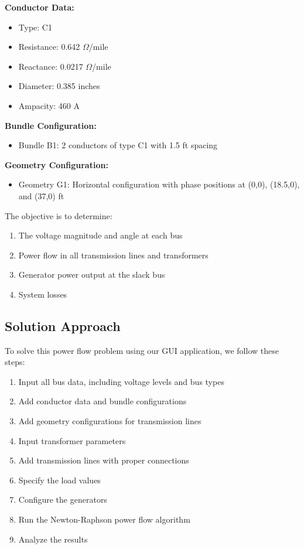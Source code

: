 \documentclass{article}
\begin{document}
	\noindent \textbf{Conductor Data:}
	\begin{itemize}
		\item Type: C1
		\item Resistance: 0.642 $\Omega$/mile
		\item Reactance: 0.0217 $\Omega$/mile
		\item Diameter: 0.385 inches
		\item Ampacity: 460 A
	\end{itemize}
	
	\noindent \textbf{Bundle Configuration:}
	\begin{itemize}
		\item Bundle B1: 2 conductors of type C1 with 1.5 ft spacing
	\end{itemize}
	
	\noindent \textbf{Geometry Configuration:}
	\begin{itemize}
		\item Geometry G1: Horizontal configuration with phase positions at (0,0), (18.5,0), and (37,0) ft
	\end{itemize}
	
	The objective is to determine:
	\begin{enumerate}
		\item The voltage magnitude and angle at each bus
		\item Power flow in all transmission lines and transformers
		\item Generator power output at the slack bus
		\item System losses
	\end{enumerate}
	
	\subsection{Solution Approach}
	
	To solve this power flow problem using our GUI application, we follow these steps:
	
	\begin{enumerate}
		\item Input all bus data, including voltage levels and bus types
		\item Add conductor data and bundle configurations
		\item Add geometry configurations for transmission lines
		\item Input transformer parameters
		\item Add transmission lines with proper connections
		\item Specify the load values
		\item Configure the generators
		\item Run the Newton-Raphson power flow algorithm
		\item Analyze the results
	\end{enumerate}
	
\end{document}
